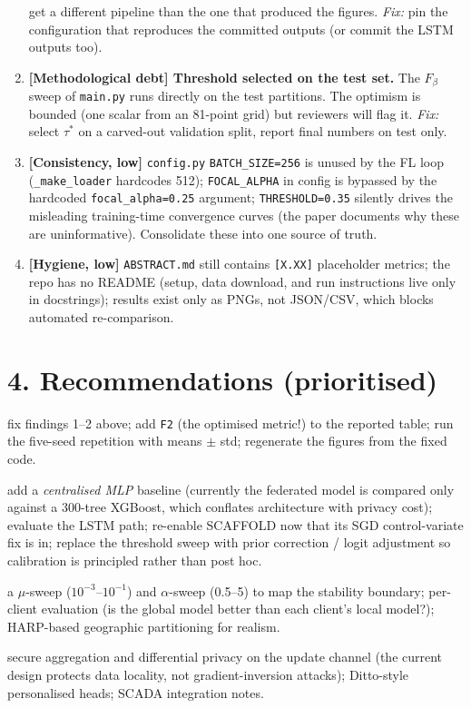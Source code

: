 \documentclass[11pt,a4paper]{article}
\newcommand{\code}[1]{\texttt{#1}}
\begin{document}
\begin{enumerate}[leftmargin=2em, itemsep=4pt]
  get a different pipeline than the one that produced the figures.
  \emph{Fix:} pin the configuration that reproduces the committed
  outputs (or commit the LSTM outputs too).
  \item \textbf{[Methodological debt] Threshold selected on the test
  set.} The $F_\beta$ sweep of \code{main.py} runs directly on the test
  partitions. The optimism is bounded (one scalar from an 81-point
  grid) but reviewers will flag it. \emph{Fix:} select $\tau^\ast$ on a
  carved-out validation split, report final numbers on test only.
  \item \textbf{[Consistency, low]} \code{config.py}
  \code{BATCH\_SIZE=256} is unused by the FL loop
  (\code{\_make\_loader} hardcodes 512); \code{FOCAL\_ALPHA} in config
  is bypassed by the hardcoded \code{focal\_alpha=0.25} argument;
  \code{THRESHOLD=0.35} silently drives the misleading training-time
  convergence curves (the paper documents why these are uninformative).
  Consolidate these into one source of truth.
  \item \textbf{[Hygiene, low]} \code{ABSTRACT.md} still contains
  \code{[X.XX]} placeholder metrics; the repo has no README (setup,
  data download, and run instructions live only in docstrings); results
  exist only as PNGs, not JSON/CSV, which blocks automated
  re-comparison.
\end{enumerate}

\section*{4. Recommendations (prioritised)}

\begin{description}[leftmargin=2em, itemsep=4pt]
  \item[P0 --- before any submission:] fix findings 1--2 above; add
  \code{F2} (the optimised metric!) to the reported table; run the
  five-seed repetition with means $\pm$ std; regenerate the figures from
  the fixed code.
  \item[P1 --- strengthens the science:] add a \emph{centralised MLP}
  baseline (currently the federated model is compared only against a
  300-tree XGBoost, which conflates architecture with privacy cost);
  evaluate the LSTM path; re-enable SCAFFOLD now that its SGD
  control-variate fix is in; replace the threshold sweep with prior
  correction / logit adjustment so calibration is principled rather
  than post hoc.
  \item[P2 --- for the venue:] a $\mu$-sweep ($10^{-3}$--$10^{-1}$) and
  $\alpha$-sweep (0.5--5) to map the stability boundary; per-client
  evaluation (is the global model better than each client's local
  model?); HARP-based geographic partitioning for realism.
  \item[P3 --- deployment track:] secure aggregation and differential
  privacy on the update channel (the current design protects data
  locality, not gradient-inversion attacks); Ditto-style personalised
  heads; SCADA integration notes.
\end{description}
\end{document}
